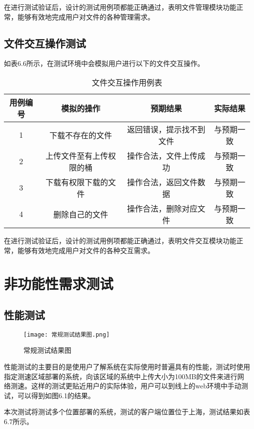 在进行测试验证后，设计的测试用例项都能正确通过，表明文件管理模块功能正常，能够有效地完成用户对文件的各种管理需求。

\subsection{文件交互操作测试}

如表6.6所示，在测试环境中会模拟用户进行以下的文件交互操作。

\begin{table}[h]
  \centering
  \caption{文件交互操作用例表}
  \begin{tabular}{cccc}
    \toprule
    用例编号 & 模拟的操作   & 预期结果 & 实际结果  \\
    \midrule
    1 & 下载不存在的文件          & 返回错误，提示找不到文件  & 与预期一致\\
    2 & 上传文件至有上传权限的桶   & 操作合法，文件上传成功    & 与预期一致\\
    3 & 下载有权限下载的文件       & 操作合法，返回文件数据   & 与预期一致\\
    4 & 删除自己的文件            & 操作合法，删除对应文件   & 与预期一致\\
    \bottomrule
  \end{tabular}
\end{table}

在进行测试验证后，设计的测试用例项都能正确通过，表明文件交互模块功能正常，能够有效地完成用户对文件的各种交互需求。

\section{非功能性需求测试}%

\subsection{性能测试}%

\begin{figure}
  \centering
  \texttt{[image: 常规测试结果图.png]}
  \caption{常规测试结果图}
\end{figure}

性能测试的主要目的是使用户了解系统在实际使用时普遍具有的性能，测试时使用指定测速区域部署的系统，向该区域的系统中上传大小为100MB的文件来进行网络测速。这样的测试更贴近用户的实际体验，用户可以到线上的web环境中手动测试，可以得到如图6.1的结果。

本次测试将测试多个位置部署的系统，测试的客户端位置位于上海，测试结果如表6.7所示。

